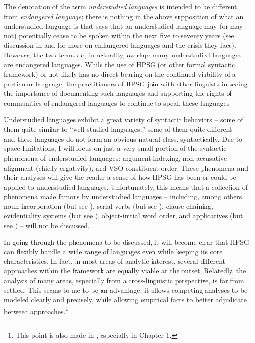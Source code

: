 \documentclass[output=paper
	        ,collection
	        ,collectionchapter
 	        ,biblatex
                ,babelshorthands
                ,newtxmath
                ,draftmode
                ,colorlinks, citecolor=brown
]{langscibook}
\begin{document}
The denotation of the term \textit{understudied languages} is intended to be different from \textit{endangered language}; there is nothing in the above supposition of what an understudied language is that says that an understudied language may (or may not) potentially cease to be spoken within the next five to seventy years (see discussion in \citealt{krauss92} and \citealt{SL13} for more on endangered languages and the crisis they face).  However, the two terms do, in actuality, overlap: many understudied languages are endangered languages. While the use of HPSG (or other formal syntactic framework) or not likely has no direct bearing on the continued viability of a particular language, the practitioners of HPSG join with other linguists in seeing the importance of documenting such languages and supporting the rights of communities of endangered languages to continue to speak these languages.       

Understudied languages exhibit a great variety of syntactic behaviors -- some of them quite similar to ``well-studied languages,'' some of them quite different -- and these languages do not form an obvious natural class, syntactically. Due to space limitations, I will focus on just a very small portion of the syntactic phenomena of understudied languages: argument indexing, non-accusative alignment (chiefly ergativity), and VSO constituent order. These phenomena and their analyses will give the reader a sense of how HPSG has been or could be applied to understudied languages. Unfortunately, this means that a collection of phenomena made famous by understudied languages -- including, among others, noun incorporation (but see \citealt{malouf99,runara03,ball05afla,ball05hpsg,ball08thesis}), serial verbs (but see \citealt{muansuwan01,muansuwan02,KDHB2007a,ML2009a,lee14}), clause-chaining, evidentiality systems (but see \citealt{lee12}), object-initial word order, and applicatives (but see \citealt{runara03,ball08thesis,ball10}) -- will not be discussed. 

In going through the phenomena to be discussed, it will become clear that HPSG can flexibly handle a wide range of languages even while keeping its core characteristics. In fact, in most areas of analytic interest, several different approaches within the framework are equally viable at the outset. Relatedly, the analysis of many areas, especially from a cross-linguistic perspective, is far from settled. This seems to me to be an advantage: it allows competing analyses to be modeled clearly and precisely, while allowing empirical facts to better adjudicate between approaches.\footnote{This point is also made in \citet{fokkens14}, especially in Chapter 1.}
\end{document}
